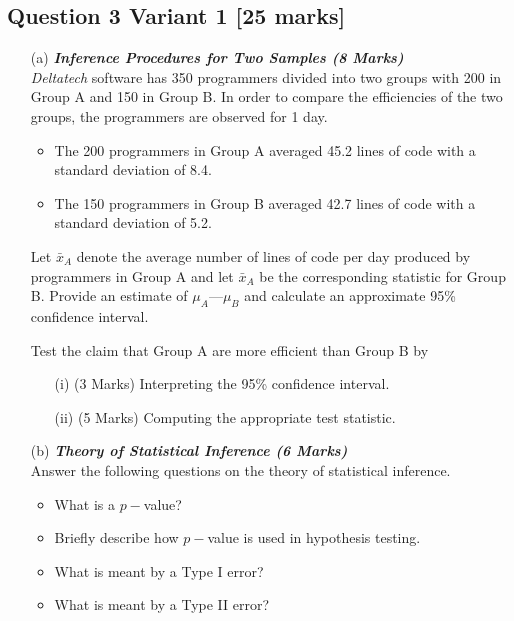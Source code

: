 \documentclass[]{article}
\begin{document}
\subsection*{Question 3 Variant 1 [25 marks]}



\begin{itemize}
\item[(a)] \textbf{\textit{Inference Procedures for Two Samples (8 Marks)}}\\

\textit{Deltatech} software has 350 programmers divided into two groups with 200 in Group A
and 150 in Group B. In order to compare the efficiencies of the two groups, the
programmers are observed for 1 day.
\begin{itemize}
\item The 200 programmers in Group A averaged 45.2 lines of code with a standard
deviation of 8.4.
\item The 150 programmers in Group B averaged 42.7 lines of code with a standard
deviation of 5.2.
\end{itemize}
Let $\bar{x}_A$ denote the average number of lines of code per day produced by programmers in
Group A and
let $\bar{x}_A$ be the corresponding statistic for Group B.
Provide an estimate of $\mu_A —\mu_B$ and calculate an approximate 95\% confidence interval.

Test the claim that Group A are more efficient than Group B by
\begin{itemize}
\item[(i)](3 Marks) Interpreting the 95\% confidence interval.
\item[(ii)](5 Marks) Computing the appropriate test statistic.
\end{itemize}

\item[(b)] \textbf{\textit{Theory of Statistical Inference (6 Marks)}}\\Answer the following questions on the theory of statistical inference.
\begin{itemize}
\item  What is a $p-$value?
\item  Briefly describe how $p-$value is used in hypothesis testing.
\item  What is meant by a Type I error?
\item   What is meant by a Type II error?
\end{itemize}
\bigskip


\end{itemize}
\end{document}
